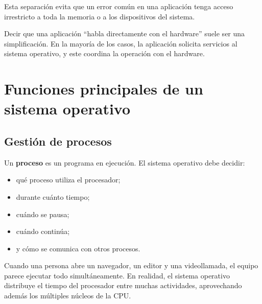 \documentclass[
  spanish,
  letterpaper,
]{scrbook}
\providecommand{\tightlist}{%
  \setlength{\itemsep}{0pt}\setlength{\parskip}{0pt}}
\begin{document}
Esta separación evita que un error común en una aplicación tenga acceso
irrestricto a toda la memoria o a los dispositivos del sistema.

\begin{tcolorbox}[enhanced jigsaw, arc=.35mm, bottomrule=.15mm, bottomtitle=1mm, breakable, colback=white, colbacktitle=quarto-callout-warning-color!10!white, colframe=quarto-callout-warning-color-frame, coltitle=black, left=2mm, leftrule=.75mm, opacityback=0, opacitybacktitle=0.6, rightrule=.15mm, title=\textcolor{quarto-callout-warning-color}{\faExclamationTriangle}\hspace{0.5em}{Error común}, titlerule=0mm, toprule=.15mm, toptitle=1mm]

Decir que una aplicación ``habla directamente con el hardware'' suele
ser una simplificación. En la mayoría de los casos, la aplicación
solicita servicios al sistema operativo, y este coordina la operación
con el hardware.

\end{tcolorbox}


\chapter{Funciones principales de un sistema
operativo}\label{funciones-principales-de-un-sistema-operativo}

\section{Gestión de procesos}\label{gestiuxf3n-de-procesos}

Un \textbf{proceso} es un programa en ejecución. El sistema operativo
debe decidir:

\begin{itemize}
\tightlist
\item
  qué proceso utiliza el procesador;
\item
  durante cuánto tiempo;
\item
  cuándo se pausa;
\item
  cuándo continúa;
\item
  y cómo se comunica con otros procesos.
\end{itemize}

Cuando una persona abre un navegador, un editor y una videollamada, el
equipo parece ejecutar todo simultáneamente. En realidad, el sistema
operativo distribuye el tiempo del procesador entre muchas actividades,
aprovechando además los múltiples núcleos de la CPU.
\end{document}
